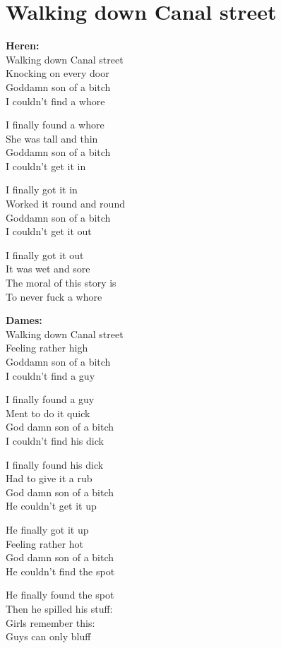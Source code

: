 \section{Walking down Canal street}
\textbf{Heren:}\\
Walking down Canal street\\
Knocking on every door\\
Goddamn son of a bitch\\
I couldn't find a whore

I finally found a whore\\
She was tall and thin\\
Goddamn son of a bitch\\
I couldn't get it in

I finally got it in\\
Worked it round and round\\
Goddamn son of a bitch\\
I couldn't get it out

I finally got it out\\
It was wet and sore\\
The moral of this story is\\
To never fuck a whore

\textbf{Dames:}\\
Walking down Canal street\\
Feeling rather high\\
Goddamn son of a bitch\\
I couldn’t find a guy

I finally found a guy\\ 
Ment to do it quick\\
God damn son of a bitch\\
I couldn’t find his dick

I finally found his dick\\
Had to give it a rub\\
God damn son of a bitch\\
He couldn’t get it up

He finally got it up\\
Feeling rather hot\\
God damn son of a bitch\\
He couldn’t find the spot

He finally found the spot\\
Then he spilled his stuff:\\
Girls remember this:\\
Guys can only bluff
